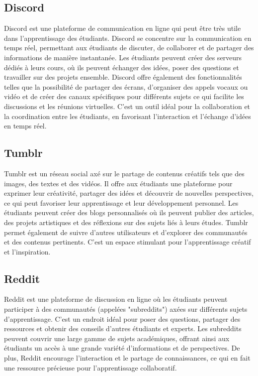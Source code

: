 \documentclass[12pt,a4paper,titlepage]{article}
\begin{document}
\subsection{Discord}
Discord est une plateforme de communication en ligne qui peut être très utile dans l'apprentissage des étudiants. Discord se concentre sur la communication en temps réel, permettant aux étudiants de discuter, de collaborer et de partager des informations de manière instantanée. Les étudiants peuvent créer des serveurs dédiés à leurs cours, où ils peuvent échanger des idées, poser des questions et travailler sur des projets ensemble. Discord offre également des fonctionnalités telles que la possibilité de partager des écrans, d'organiser des appels vocaux ou vidéo et de créer des canaux spécifiques pour différents sujets ce qui facilite les discussions et les réunions virtuelles. C'est un outil idéal pour la collaboration et la coordination entre les étudiants, en favorisant l'interaction et l'échange d'idées en temps réel.
\subsection{Tumblr}
Tumblr est un réseau social axé sur le partage de contenus créatifs tels que des images, des textes et des vidéos. Il offre aux étudiants une plateforme pour exprimer leur créativité, partager des idées et découvrir de nouvelles perspectives, ce qui peut favoriser leur apprentissage et leur développement personnel. Les étudiants peuvent créer des blogs personnalisés où ils peuvent publier des articles, des projets artistiques et des réflexions sur des sujets liés à leurs études. Tumblr permet également de suivre d'autres utilisateurs et d'explorer des communautés et des contenus pertinents. C'est un espace stimulant pour l'apprentissage créatif et l'inspiration.
\subsection{Reddit}
Reddit est une plateforme de discussion en ligne où les étudiants peuvent participer à des communautés (appelées "subreddits") axées sur différents sujets d'apprentissage. C'est un endroit idéal pour poser des questions, partager des ressources et obtenir des conseils d'autres étudiants et experts. Les subreddits peuvent couvrir une large gamme de sujets académiques, offrant ainsi aux étudiants un accès à une grande variété d'informations et de perspectives. De plus, Reddit encourage l'interaction et le partage de connaissances, ce qui en fait une ressource précieuse pour l'apprentissage collaboratif.
\end{document}
